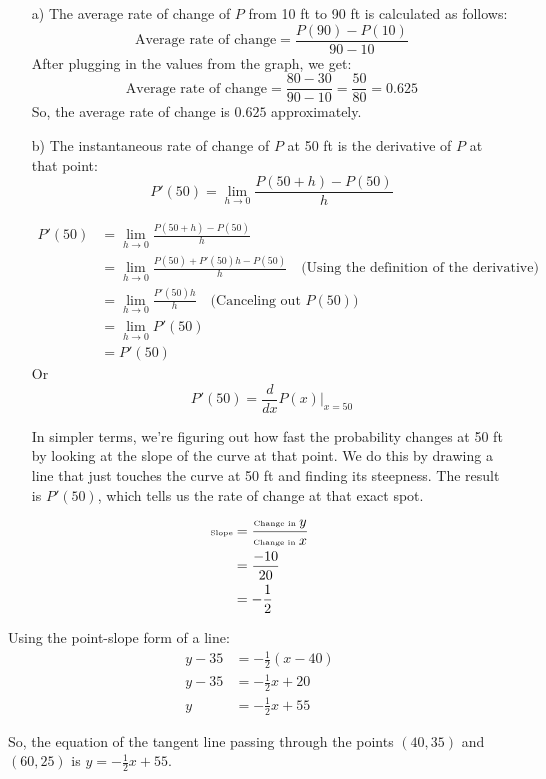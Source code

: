 \documentclass{article}
\newenvironment{solution}{\color{solutioncolor}}{}
\begin{document}
\begin{solution}
    \begin{enumerate}
    \item[a)] The average rate of change of \( P \) from 10 ft to 90 ft is calculated as follows:
    \[
    \text{Average rate of change} = \frac{P(90) - P(10)}{90 - 10}
    \]
 After plugging in the values from the graph, we get:
    \[
    \text{Average rate of change} = \frac{80 - 30}{90 - 10} = \frac{50}{80} = 0.625
    \]
    So, the average rate of change is \( 0.625 \) approximately.

    
    \item[b)] The instantaneous rate of change of \( P \) at 50 ft is the derivative of \( P \) at that point:
    \[
    P'(50) = \lim_{h \to 0} \frac{P(50+h) - P(50)}{h}
    \]

\begin{align*}
P'(50) &= \lim_{h \to 0} \frac{P(50+h) - P(50)}{h} \\
&= \lim_{h \to 0} \frac{P(50) + P'(50)h - P(50)}{h} \quad \text{(Using the definition of the derivative)} \\
&= \lim_{h \to 0} \frac{P'(50)h}{h} \quad \text{(Canceling out \(P(50)\))} \\
&= \lim_{h \to 0} P'(50) \\
&= P'(50)
\end{align*}
Or
\[
P'(50) = \frac{d}{dx} P(x) \bigg|_{x=50}
\]

In simpler terms, we're figuring out how fast the probability changes at 50 ft by looking at the slope of the curve at that point. We do this by drawing a line that just touches the curve at 50 ft and finding its steepness. The result is \( P'(50) \), which tells us the rate of change at that exact spot.
    
\end{enumerate}

\begin{align*}
    \text{\tiny Slope} &= \frac{{\text{\tiny Change in } y}}{{\text{\tiny Change in } x}} \\
    &= \frac{{-10}}{{20}} \\
    &= -\frac{1}{2}
\end{align*}

Using the point-slope form of a line:
\begin{align*}
    y - 35 &= -\frac{1}{2}(x - 40) \\
    y - 35 &= -\frac{1}{2}x + 20 \\
    y &= -\frac{1}{2}x + 55
\end{align*}

So, the equation of the tangent line passing through the points \( (40, 35) \) and \( (60, 25) \) is \( y = -\frac{1}{2}x + 55 \).

\end{solution}
\end{document}
